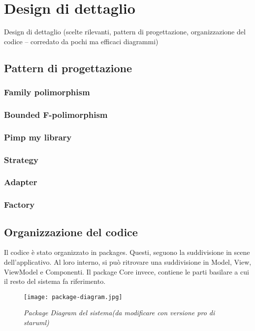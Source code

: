 \section{Design di dettaglio}
Design di dettaglio (scelte rilevanti, pattern di progettazione, organizzazione del codice -- corredato da pochi ma efficaci diagrammi)

\subsection{Pattern di progettazione}
\subsubsection{Family polimorphism}
\subsubsection{Bounded F-polimorphism}
\subsubsection{Pimp my library}
\subsubsection{Strategy}
\subsubsection{Adapter}
\subsubsection{Factory}

\subsection{Organizzazione del codice}
Il codice è stato organizzato in packages. Questi, seguono la suddivisione in scene dell'applicativo. Al loro interno, si può ritrovare una suddivisione in Model, View, ViewModel e Componenti.
Il package Core invece, contiene le parti basilare a cui il resto del sistema fa riferimento.

\begin{figure}[!hbt]
    \centering
    \texttt{[image: package-diagram.jpg]}
    \caption{\textit{Package Diagram del sistema(da modificare con versione pro di staruml)}} 
\end{figure}